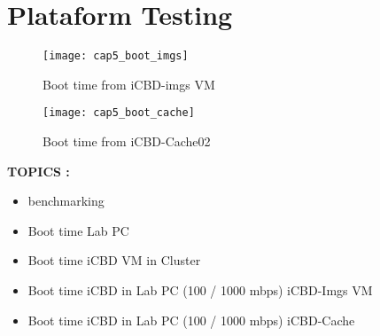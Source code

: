 


\section{Plataform Testing}
\label{sub:eval_integration_testing}

\begin{figure}[htbp]
	\centering
	\texttt{[image: cap5\_boot\_imgs]}
	\caption{Boot time from iCBD-imgs VM}
	\label{fig:boot_imgs}
\end{figure}

\begin{figure}[htbp]
	\centering
	\texttt{[image: cap5\_boot\_cache]}
	\caption{Boot time from iCBD-Cache02}
	\label{fig:boot_cache}
\end{figure}


\textbf{TOPICS :}
\begin{itemize}
	\item benchmarking 
	\item Boot time Lab PC
	\item Boot time iCBD VM in Cluster
	\item Boot time iCBD in Lab PC (100 / 1000 mbps) iCBD-Imgs VM
	\item Boot time iCBD in Lab PC (100 / 1000 mbps) iCBD-Cache
\end{itemize}